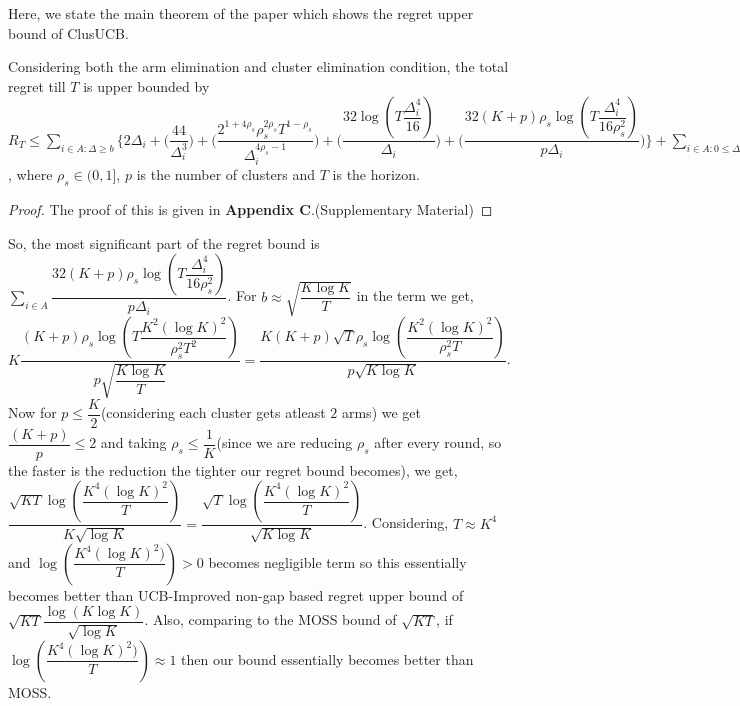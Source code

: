 	
	Here, we state the main theorem of the paper which shows the regret upper bound of ClusUCB.
	
\begin{theorem}
Considering both the arm elimination and cluster elimination condition, the total regret till $T$ is upper bounded by $R_{T}\leq \sum_{i\in A:\Delta\geq b} \bigg\lbrace 2\Delta_{i}+ \bigg(\dfrac{44}{\Delta_{i}^{3}}\bigg) + \bigg(\dfrac{2^{1+4\rho_{s}}\rho_{s}^{2\rho_{s}}T^{1-\rho_{s}}}{\Delta_{i}^{4\rho_{s}-1}}\bigg) + \bigg(\dfrac{32\log{(T\dfrac{\Delta_{i}^{4}}{16})}}{\Delta_{i}}\bigg) + \bigg(\dfrac{32(K+p)\rho_{s}\log{(T\dfrac{\Delta_{i}^{4}}{16\rho_{s}^{2}})}}{p\Delta_{i}}\bigg)\bigg\rbrace + \sum_{i\in A:0\leq\Delta_{i}\leq b}\bigg\lbrace \bigg(\dfrac{12}{b^{3}} \bigg) + \bigg(\dfrac{T^{1-\rho_{s}}2^{2\rho_{s}+\frac{3}{2}}}{\Delta_{i}^{3}} \bigg)+\bigg(\dfrac{T^{1-\rho_{s}}2^{2\rho_{s}+\frac{3}{2}}}{b^{4\rho_{s} -1}} \bigg) \bigg\rbrace + max_{i:\Delta\leq b}\Delta_{i}T $, where $\rho_{s}\in (0,1]$, $p$ is the number of clusters and $T$ is the horizon.
\end{theorem}

\begin{proof}
	The proof of this is given in \textbf{Appendix C}.(Supplementary Material)
\end{proof}

\begin{remark}
So, the most significant part of the regret bound is $\sum_{i\in A}\dfrac{32(K+p)\rho_{s}\log{(T\dfrac{\Delta_{i}^{4}}{16\rho_{s}^{2}})}}{p\Delta_{i}}$. For $b\approx \sqrt{\dfrac{K\log K}{T}}$ in the term we get, $K\dfrac{(K+p)\rho_{s}\log{(T\dfrac{K^{2}(\log K)^{2}}{\rho_{s}^{2}T^{2}})}}{p \sqrt{\dfrac{K\log K}{T}}}=\dfrac{K(K+p)\sqrt{T}\rho_{s}\log{(\dfrac{K^{2}(\log K)^{2}}{\rho_{s}^{2}T})}}{p \sqrt{K\log K}}$. Now for $p\leq \dfrac{K}{2}$(considering each cluster gets atleast $2$ arms) we get $\dfrac{(K+p)}{p}\leq  2$ and taking $\rho_{s}\leq\dfrac{1}{K}$(since we are reducing  $\rho_{s}$ after every round, so the faster is the reduction the tighter our regret bound becomes), we get, $\dfrac{\sqrt{KT}\log{(\dfrac{K^{4}(\log K)^{2}}{T})}}{K\sqrt{\log K}}=\dfrac{\sqrt{T}\log{(\dfrac{K^{4}(\log K)^{2}}{T})}}{\sqrt{K\log K}}$. Considering, $T\approx K^{4}$ and $\log(\dfrac{K^{4}(\log K)^{2})}{T})>0$ becomes negligible term so this essentially becomes better than UCB-Improved non-gap based regret upper bound of $\sqrt{KT}\dfrac{\log(K\log K)}{\sqrt{\log K}}$. Also, comparing to the MOSS bound of $\sqrt{KT}$, if $\log(\dfrac{K^{4}(\log K)^{2})}{T})\approx 1$ then our bound essentially becomes better than MOSS.
\end{remark}

